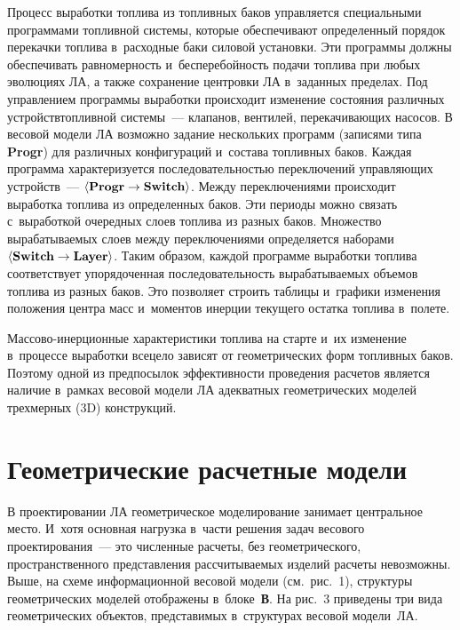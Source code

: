 \begin{multicols}{2}
  
  Процесс выработки топлива из топливных баков управляется специальными 
программами топливной системы, которые обеспечивают определенный 
порядок перекачки топлива в~расходные баки силовой установки. Эти 
программы должны обеспечивать равномерность и~бесперебойность подачи 
топлива при любых эволюциях ЛА, а также сохранение центровки ЛА 
в~заданных пределах.\linebreak
 Под управлением программы выработки происходит 
изменение %
состояния различных устройств\linebreak топливной системы~--- клапанов, 
вентилей, перекачивающих насосов. В весовой модели ЛА возможно задание 
нескольких программ (записями типа \textbf{Progr}) для {раз\-лич\-ных} конфигураций 
и~со\-ста\-ва топ\-лив\-ных баков. Каждая программа характеризуется 
по\-сле\-до\-ва\-тель\-ностью пе\-ре\-клю\-чений управ\-ля\-ющих устройств~--- 
$\langle \mbox{\textbf{Progr}}\hm \to \mbox{\textbf{Switch}}\rangle$. Между 
переключениями происходит выработка топлива из определенных \mbox{баков}. Эти 
периоды можно связать с~выработкой очередных слоев топлива из разных 
\mbox{баков}. Множество вырабатываемых слоев между переключениями определяется 
наборами 
$\langle \mbox{\textbf{Switch}}\hm \to \mbox{\textbf{Layer}}\rangle$. Таким 
образом, каждой программе выработки топлива соответствует упорядоченная 
после\-до\-ва\-тель\-ность вырабатываемых объемов топлива из разных баков. Это 
позволяет строить таблицы и~графики изменения положения центра масс 
и~моментов инерции текущего остатка топлива в~полете.
{ %

} 
  
  Массово-инерционные характеристики топлива на старте и~их изменение в~процессе выработки всецело 
зависят от геометрических форм топливных баков. Поэтому одной из 
предпосылок эффективности проведения расчетов является наличие в~рамках 
весовой модели ЛА адекватных геометрических моделей трехмерных (3D)
конструкций. 


\vspace*{-3pt}
  
\section{Геометрические расчетные модели}


  В проектировании ЛА геометрическое моделирование занимает центральное 
место. И~хотя основная нагрузка в~части решения задач весового 
проектирования~--- это численные расчеты, без геометриче\-ско\-го, 
пространственного представления рассчитываемых изделий расчеты 
невозможны. Выше, на схеме информационной весовой модели (см.\ рис.~1), 
структуры геометрических моделей отоб\-ра\-же\-ны в~блоке~\textbf{В}. На рис.~3 
приведены три вида геометрических объектов, представимых в~структурах 
весовой модели~ЛА. 
  

\end{multicols}
